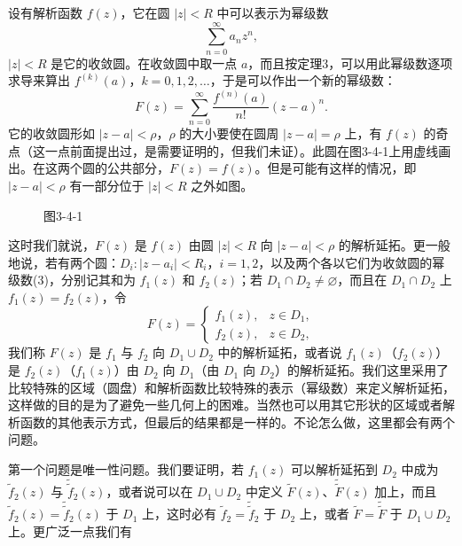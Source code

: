 设有解析函数 $f(z)$，它在圆 $|z|<R$ 中可以表示为幂级数
\[
 \sum_{n=0}^{\infty}a_nz^n,
\]
$|z|<R$ 是它的收敛圆。在收敛圆中取一点 $a$，而且按定理3，可以用此幂级数逐项求导来算出 $f^{(k)}(a)$，$k=0,1,2,\ldots$，于是可以作出一个新的幂级数：
\[
 F(z)=\sum_{n=0}^{\infty}\frac{f^{(n)}(a)}{n!}(z-a)^n.
\]
它的收敛圆形如 $|z-a|<\rho$，$\rho$ 的大小要使在圆周 $|z-a|=\rho$ 上，有 $f(z)$ 的奇点（这一点前面提出过，是需要证明的，但我们未证）。此圆在图3-4-1上用虚线画出。在这两个圆的公共部分，$F(z)=f(z)$。但是可能有这样的情况，即 $|z-a|<\rho$ 有一部分位于 $|z|<R$ 之外如图。
\begin{figure}[htbp]
\centering
{}
\caption*{图3-4-1}
\end{figure}
这时我们就说，$F(z)$ 是 $f(z)$ 由圆 $|z|<R$ 向 $|z-a|<\rho$ 的解析延拓。更一般地说，若有两个圆：$D_i:|z-a_i|<R_i$，$i=1,2$，以及两个各以它们为收敛圆的幂级数(3)，分别记其和为 $f_1(z)$ 和 $f_2(z)$；若 $D_1\cap D_2\ne\varnothing$，而且在 $D_1\cap D_2$ 上 $f_1(z)=f_2(z)$，令
\[
 F(z)=
 \begin{cases}
 f_1(z),&z\in D_1,\\
 f_2(z),&z\in D_2,
 \end{cases}
\]
我们称 $F(z)$ 是 $f_1$ 与 $f_2$ 向 $D_1\cup D_2$ 中的解析延拓，或者说 $f_1(z)$（$f_2(z)$）是 $f_2(z)$（$f_1(z)$）由 $D_2$ 向 $D_1$（由 $D_1$ 向 $D_2$）的解析延拓。我们这里采用了比较特殊的区域（圆盘）和解析函数比较特殊的表示（幂级数）来定义解析延拓，这样做的目的是为了避免一些几何上的困难。当然也可以用其它形状的区域或者解析函数的其他表示方式，但最后的结果都是一样的。不论怎么做，这里都会有两个问题。

第一个问题是唯一性问题。我们要证明，若 $f_1(z)$ 可以解析延拓到 $D_2$ 中成为 $\widetilde f_2(z)$ 与 $\widetilde{\widetilde f}_2(z)$，或者说可以在 $D_1\cup D_2$ 中定义 $\widetilde F(z)$、$\widetilde{\widetilde F}(z)$ 加上，而且 $\widetilde f_2(z)=\widetilde{\widetilde f}_2(z)$ 于 $D_1$ 上，这时必有 $\widetilde f_2=\widetilde{\widetilde f}_2$ 于 $D_2$ 上，或者 $\widetilde F=\widetilde{\widetilde F}$ 于 $D_1\cup D_2$ 上。更广泛一点我们有

